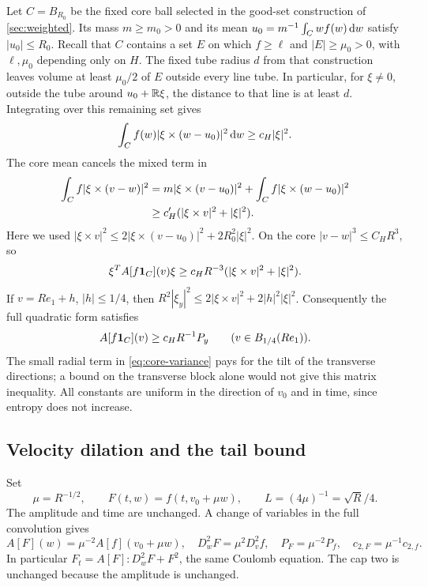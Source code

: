 Let $C=B_{R_0}$ be the fixed core ball selected in the good-set construction of \cref{sec:weighted}. Its mass $m\ge m_0>0$ and its mean
$u_0=m^{-1}\int_Cwf(w)\,\mathrm dw$ satisfy $|u_0|\le R_0$. Recall that $C$ contains a set $E$ on which $f\ge\ell$ and $|E|\ge\mu_0>0$, with $\ell,\mu_0$ depending only on $H$. The fixed tube radius $d$ from that construction leaves volume at least $\mu_0/2$ of $E$ outside every line tube. In particular, for $\xi\ne0$, outside the tube around $u_0+\mathbb R\xi$, the distance to that line is at least $d$. Integrating over this remaining set gives
\[
 \int_Cf(w)|\xi\times(w-u_0)|^2\,\mathrm dw\ge c_H|\xi|^2.
\]
The core mean cancels the mixed term in
\begin{align}\label{eq:core-variance}
 \int_Cf|\xi\times(v-w)|^2
 &=m|\xi\times(v-u_0)|^2+\int_Cf|\xi\times(w-u_0)|^2\notag\\
 &\ge c_H'(|\xi\times v|^2+|\xi|^2).
\end{align}
Here we used $|\xi\times v|^2\le2|\xi\times(v-u_0)|^2+2R_0^2|\xi|^2$. On the core $|v-w|^3\le C_HR^3$, so
\[
 \xi^TA[f\mathbf 1_C](v)\xi\ge c_HR^{-3}(|\xi\times v|^2+|\xi|^2).
\]
If $v=Re_1+h$, $|h|\le1/4$, then
$R^2|\xi_y|^2\le2|\xi\times v|^2+2|h|^2|\xi|^2$.
Consequently the full quadratic form satisfies
\begin{equation}\label{eq:physical-core}
 A[f\mathbf 1_C](v)\ge c_HR^{-1}P_y\qquad(v\in B_{1/4}(Re_1)).
\end{equation}
The small radial term in \eqref{eq:core-variance} pays for the tilt of the transverse directions; a bound on the transverse block alone would not give this matrix inequality. All constants are uniform in the direction of $v_0$ and in time, since entropy does not increase.

\subsection{Velocity dilation and the tail bound}

Set
\begin{equation}\label{eq:tail-dilation}
 \mu=R^{-1/2},\qquad F(t,w)=f(t,v_0+\mu w),\qquad L=(4\mu)^{-1}=\sqrt R/4.
\end{equation}
The amplitude and time are unchanged. A change of variables in the full convolution gives
\begin{equation}\label{eq:dilation-rules}
 A[F](w)=\mu^{-2}A[f](v_0+\mu w),\quad
 D_w^2F=\mu^2D_v^2f,\quad
 P_F=\mu^{-2}P_f,\quad c_{2,F}=\mu^{-1}c_{2,f}.
\end{equation}
In particular $F_t=A[F]:D_w^2F+F^2$, the same Coulomb equation. The cap two is unchanged because the amplitude is unchanged.

